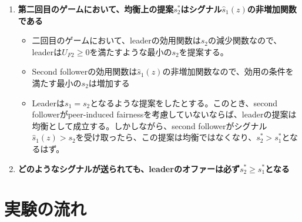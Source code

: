 \documentclass[../root]{subfiles}
\begin{document}
    \begin{enumerate}
    \def\labelenumi{\arabic{enumi}.}
    
    \item
      \textbf{第二回目のゲームにおいて、均衡上の提案\(s_2^*\)はシグナル\(\hat{s}_1(z)\)の非増加関数である}

      \begin{itemize}
      
      \item
        二回目のゲームにおいて、leaderの効用関数は\(s_2\)の減少関数なので、leaderは\(U_{F2} \ge 0\)を満たすような最小の\(s_2\)を提案する。
      \item
        Second followerの効用関数は\(\hat{s}_1(z)\)の非増加関数なので、効用の条件を満たす最小の\(s_2\)は増加する
      \item
        Leaderは\(s_1 = s_2\)となるような提案をしたとする。このとき、second followerがpeer-induced fairnessを考慮していないならば、leaderの提案は均衡として成立する。しかしながら、second followerがシグナル\(\hat{s}_1(z) > s_2\)を受け取ったら、この提案は均衡ではなくなり、\(s_2^* > s_1^*\)となるはず。
      \end{itemize}
    \item
      \textbf{どのようなシグナルが送られても、leaderのオファーは必ず\(s_2^* \ge s_1^*\)となる}
    \end{enumerate}

    \hypertarget{ux5b9fux9a13ux306eux6d41ux308c}{%
    \section{実験の流れ}\label{ux5b9fux9a13ux306eux6d41ux308c}}
\end{document}
